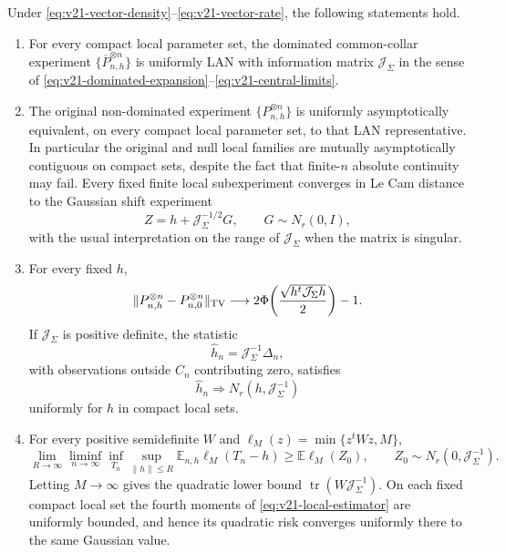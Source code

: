 \begin{theorem}
\label{thm:v21-vector-boundary-gaussian}
Under \eqref{eq:v21-vector-density}--\eqref{eq:v21-vector-rate}, the following
statements hold.

\begin{enumerate}
\item For every compact local parameter set, the dominated common-collar
experiment $\{\overline P_{n,h}^{\otimes n}\}$ is uniformly LAN with
information matrix $\mathcal J_\Sigma$ in the sense of
\eqref{eq:v21-dominated-expansion}--\eqref{eq:v21-central-limits}.

\item The original non-dominated experiment
$\{P_{n,h}^{\otimes n}\}$ is uniformly asymptotically equivalent, on every
compact local parameter set, to that LAN representative.  In particular the
original and null local families are mutually asymptotically contiguous on
compact sets, despite the fact that finite-$n$ absolute continuity may fail.
Every fixed finite local subexperiment converges in Le Cam distance to the
Gaussian shift experiment
\[
                         Z=h+\mathcal J_\Sigma^{-1/2}G,
 \qquad G\sim N_r(0,I),
\]
with the usual interpretation on the range of $\mathcal J_\Sigma$ when the
matrix is singular.

\item For every fixed $h$,
\begin{equation}\label{eq:v21-testing-profile}
 \|P_{n,h}^{\otimes n}-P_{n,0}^{\otimes n}\|_{\rm TV}
 \longrightarrow
 2\Phi\!\left(\frac{\sqrt{h^t\mathcal J_\Sigma h}}2\right)-1.
\end{equation}
If $\mathcal J_\Sigma$ is positive definite, the statistic
\begin{equation}\label{eq:v21-local-estimator}
 \widehat h_n=\mathcal J_\Sigma^{-1}\Delta_n,
\end{equation}
with observations outside $C_n$ contributing zero, satisfies
\[
 \widehat h_n\Rightarrow N_r(h,\mathcal J_\Sigma^{-1})
\]
uniformly for $h$ in compact local sets.

\item For every positive semidefinite $W$ and
$\ell_M(z)=\min\{z^tWz,M\}$,
\begin{equation}\label{eq:v21-minimax-truncated}
 \lim_{R\to\infty}\liminf_{n\to\infty}
 \inf_{T_n}\sup_{\|h\|\le R}
 \mathbb E_{n,h}\ell_M(T_n-h)
 \ge \mathbb E\ell_M(Z_0),
 \qquad Z_0\sim N_r(0,\mathcal J_\Sigma^{-1}).
\end{equation}
Letting $M\to\infty$ gives the quadratic lower bound
$\operatorname{tr}(W\mathcal J_\Sigma^{-1})$.  On each fixed compact local
set the fourth moments of \eqref{eq:v21-local-estimator} are uniformly
bounded, and hence its quadratic risk converges uniformly there to the same
Gaussian value.
\end{enumerate}
\end{theorem}

